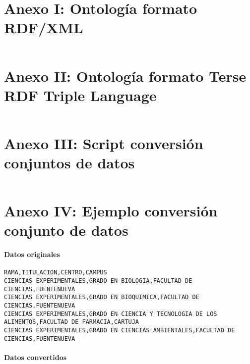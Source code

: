 \appendix
\clearpage
\addappheadtotoc
\appendixpage
\chapter{Anexo I: Ontología formato RDF/XML}

\label{anexo_i}
\inputminted[tabsize=2,breaklines]{xml}{../../data/semantic/ontology/ugr.rdf}

\chapter{Anexo II: Ontología formato Terse RDF Triple Language}
\label{anexo_ii}
\inputminted[tabsize=2,breaklines]{text}{../../data/semantic/ontology/ugr.ttl}

\chapter{Anexo III: Script conversión conjuntos de datos}
\label{anexo_iii}
\inputminted[tabsize=2,breaklines]{python}{../../data/scripts/OfertaTitulacion.py}

\chapter{Anexo IV: Ejemplo conversión conjunto de datos}
\label{anexo_iv}

\subsubsection{Datos originales}

\begin{verbatim}
RAMA,TITULACION,CENTRO,CAMPUS
CIENCIAS EXPERIMENTALES,GRADO EN BIOLOGI­A,FACULTAD DE CIENCIAS,FUENTENUEVA
CIENCIAS EXPERIMENTALES,GRADO EN BIOQUI­MICA,FACULTAD DE CIENCIAS,FUENTENUEVA
CIENCIAS EXPERIMENTALES,GRADO EN CIENCIA Y TECNOLOGI­A DE LOS ALIMENTOS,FACULTAD DE FARMACIA,CARTUJA
CIENCIAS EXPERIMENTALES,GRADO EN CIENCIAS AMBIENTALES,FACULTAD DE CIENCIAS,FUENTENUEVA
\end{verbatim}

\subsubsection{Datos convertidos}

